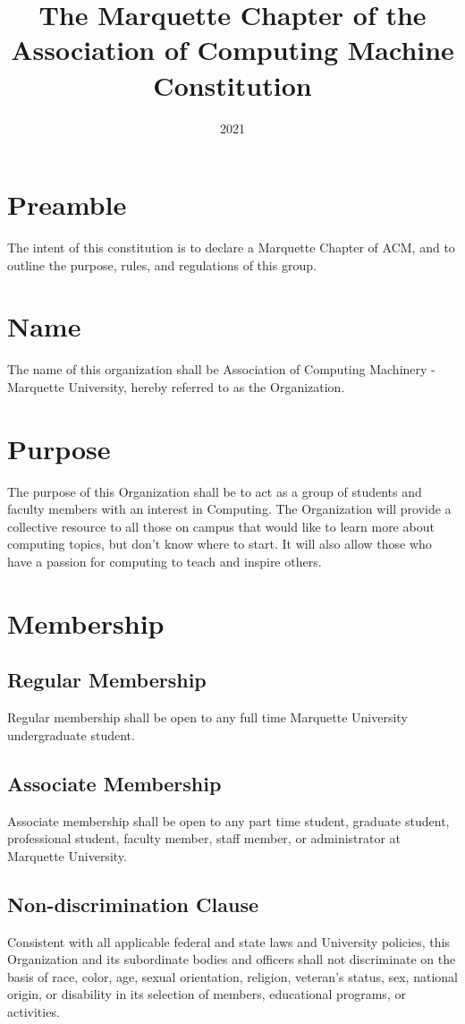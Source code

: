 \documentclass{article}
\title{The Marquette Chapter of the Association of Computing Machine Constitution}
\date{2021}
\begin{document}
\maketitle

\section*{Preamble}
The intent of this constitution is to declare a Marquette Chapter of ACM, and to outline the purpose, rules, and regulations of this group.

\section{Name}
The name of this organization shall be Association of Computing Machinery - Marquette University, hereby referred to as the Organization.

\section{Purpose}
The purpose of this Organization shall be to act as a group of students and faculty members with an interest in Computing. The Organization will provide a collective resource to all those on campus that would like to learn more about computing topics, but don’t know where to start. It will also allow those who have a passion for computing to teach and inspire others. 

\section{Membership}
\subsection{Regular Membership}
Regular membership shall be open to any full time Marquette University undergraduate student.
\subsection{Associate Membership}
Associate membership shall be open to any part time student, graduate student, professional student, faculty member, staff member, or administrator at Marquette University.
\subsection{Non-discrimination Clause}
Consistent with all applicable federal and state laws and University policies, this Organization and its subordinate bodies and officers shall not discriminate on the basis of race, color, age, sexual orientation, religion, veteran's status, sex, national origin, or disability in its selection of members, educational programs, or activities.
\end{document}
